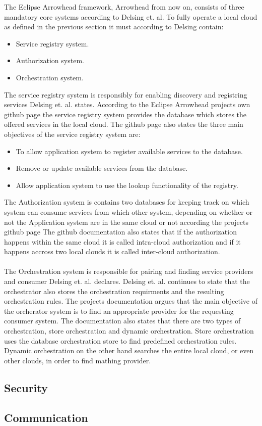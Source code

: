 The Eclipse Arrowhead framework, Arrowhead from now on, consists of three mandatory core systems according to Delsing et. al. \cite{Delsing2017}
To fully operate a local cloud as defined in the previous section it must according to Delsing \cite{Delsing2017} contain:
\begin{itemize}
    \item Service registry system.
    \item Authorization system. 
    \item Orchestration system.
\end{itemize}
The service registry system is responsibly for enabling discovery and registring services Delsing et. al. \cite{Delsing2017} states. 
According to the Eclipse Arrowhead projects own github page \cite{Github2021} the service registry system provides the database which stores the offered services in the local cloud.
The github page also states the three main objectives of the service registry system are:
\begin{itemize}
    \item To allow application system to register available services to the database. 
    \item Remove or update available services from the database.
    \item Allow application system to use the lookup functionality of the registry.
\end{itemize}
The Authorization system is contains two databases for keeping track on which system can consume services from which other system, depending on whether or not the Application system are in the same cloud or not according the projects github page \cite{Github2021}
The github documentation also states that if the authorization happens within the same cloud it is called intra-cloud authorization and if it happens accross two local clouds it is called inter-cloud authorization. \cite{Github2021} \\ \\
The Orchestration system is responsible for pairing and finding service providers and consumer Delsing et. al. declares. \cite{Delsing2017} 
Delsing et. al. continues to state that the orchestrator also stores the orchestration requirments and the resulting orchestration rules. \cite{Delsing2017} 
The projects documentation argues that the main objective of the orcherator system is to find an appropriate provider for the requesting consumer system. \cite{Github2021}
The documentation also states that there are two types of orchestration, store orchestration and dynamic orchestration.
Store orchestration uses the database orchestration store to find predefined orchestration rules.
Dynamic orchestration on the other hand searches the entire local cloud, or even other clouds, in order to find mathing provider. \cite{Github2021}
\subsection{Security}
\subsection{Communication} 
